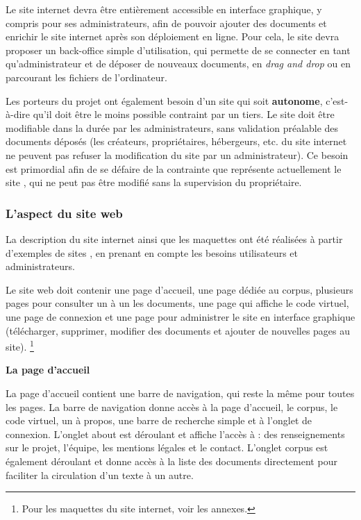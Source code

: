 Le site internet devra être entièrement accessible en interface graphique, y compris pour ses administrateurs, afin de pouvoir ajouter des documents et enrichir le site internet après son déploiement en ligne. Pour cela, le site devra proposer un back-office simple d’utilisation, qui permette de se connecter en tant qu’administrateur et de déposer de nouveaux documents, en \textit{drag and drop} ou en parcourant les fichiers de l’ordinateur. 

Les porteurs du projet ont également besoin d’un site qui soit \textbf{autonome}, c’est-à-dire qu’il doit être le moins possible contraint par un tiers. Le site doit être modifiable dans la durée par les administrateurs, sans validation préalable des documents déposés (les créateurs, propriétaires, hébergeurs, etc. du site internet ne peuvent pas refuser la modification du site par un administrateur). Ce besoin est primordial afin de se défaire de la contrainte que représente actuellement le site \LSC, qui ne peut pas être modifié sans la supervision du propriétaire.

\subsubsection{L'aspect du site web}
La description du site internet ainsi que les maquettes ont été réalisées à partir d’exemples de sites \tp, en prenant en compte les besoins utilisateurs et administrateurs. 

Le site web doit contenir une page d’accueil, une page dédiée au corpus, plusieurs pages pour consulter un à un les documents, une page qui affiche le code virtuel, une page de connexion et une page pour administrer le site en interface graphique (télécharger, supprimer, modifier des documents et ajouter de nouvelles pages au site). \footnote{Pour les maquettes du site internet, voir les annexes. }

\bigskip
\textbf{La page d’accueil}

La page d’accueil contient une barre de navigation, qui reste la même pour toutes les pages. La barre de navigation donne accès à la page d’accueil, le corpus, le code virtuel, un à propos, une barre de recherche simple et à l’onglet de connexion. L’onglet \og about \fg est déroulant et affiche l’accès à : des renseignements sur le projet, l’équipe, les mentions légales et le contact. L’onglet \og corpus \fg est également déroulant et donne accès à la liste des documents directement pour faciliter la circulation d’un texte à un autre.

